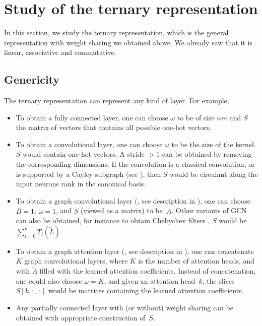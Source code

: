 \section{Study of the ternary representation}
\label{sec:ternary}

In this section, we study the ternary representation, which is the general representation with weight sharing we obtained above. We already saw that it is linear, associative and commutative.

\subsection{Genericity}

The ternary representation can represent any kind of layer. For example,
\begin{itemize}
\item To obtain a fully connected layer, one can choose $\omega$ to be of size $nm$ and $S$ the matrix of vectors that contains all possible one-hot vectors.
\item To obtain a convolutional layer, one can choose $\omega$ to be the size of the kernel. $S$ would contain one-hot vectors. A stride $> 1$ can be obtained by removing the corresponding dimensions. If the convolution is a classical convolution, or is supported by a Cayley subgraph (see ), then $S$ would be circulant along the input neurons rank in the canonical basis.
\item To obtain a graph convolutional layer (\cite{kipf2016semi}, see description in ), one can choose $B = 1$, $\omega = 1$, and $S$ (viewed as a matrix) to be~$\widetilde{A}$. Other variants of GCN can also be obtained, for instance to obtain Chebychev filters \citep{defferrard2016convolutional}, $S$ would be $\sum_{i=0}^k T_i(\widetilde{L})$.
\item To obtain a graph attention layer (\cite{velickovic2017graph}, see description in ), one can concatenate $K$ graph convolutional layers, where $K$ is the number of attention heads, and with $\widetilde{A}$ filled with the learned attention coefficients. Instead of concatenation, one could also choose $\omega=K$, and given an attention head~$k$, the slices $S[k,:,:]$ would be matrices containing the learned attention coefficients.
\item Any partially connected layer with (or without) weight sharing can be obtained with appropriate construction of~$S$.
\end{itemize}

